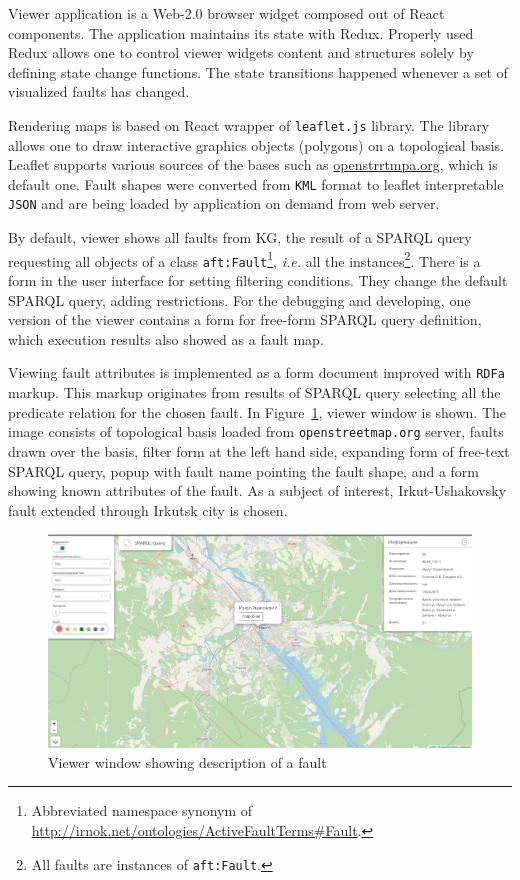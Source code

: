 \documentclass[
]{ceurart}
\begin{document}
Viewer application is a Web-2.0 browser widget composed out of React components.  The application maintains its state with Redux. Properly used Redux allows one to control viewer widgets content and structures solely by defining state change functions.  The state transitions happened whenever a set of visualized faults has changed.

Rendering maps is based on React wrapper of \texttt{leaflet.js} library.  The library allows one to draw interactive graphics objects (polygons) on a topological basis.  Leaflet supports various sources of the bases such as \href{https://openstreetmap.org/}{openstrrtmpa.org}, which is default one.  Fault shapes were converted from \texttt{KML} format to leaflet interpretable \texttt{JSON} and are being loaded by application on demand from web server.

By default, viewer shows all faults from KG, the result of a SPARQL query requesting all objects of a class \texttt{aft:Fault}\footnote{Abbreviated namespace synonym of \url{http://irnok.net/ontologies/ActiveFaultTerms\#Fault}.}, \emph{i.e.} all the instances\footnote{All faults are instances of \texttt{aft:Fault}.}.  There is a form in the user interface for setting filtering conditions.  They change the default SPARQL query, adding restrictions.  For the debugging and developing, one version of the viewer contains a form for free-form SPARQL query definition, which execution results also showed as a fault map.

Viewing fault attributes is implemented as a form document improved with \texttt{RDFa} markup.  This markup originates from results of SPARQL query selecting all the predicate relation for the chosen fault.
%
%
In Figure~\ref{fig:ex}, viewer window is shown.  The image consists of topological basis loaded from \texttt{openstreetmap.org} server, faults drawn over the basis, filter form at the left hand side, expanding form of free-text SPARQL query, popup with fault name pointing the fault shape, and a form showing known attributes of the fault.  As a subject of interest, Irkut-Ushakovsky fault extended through Irkutsk city is chosen.

\begin{figure}
  \centering
  \includegraphics[width=\linewidth]{faults-leaflet-doc.png}
  \caption{Viewer window showing description of a fault}
  \label{fig:ex}
\end{figure}
\end{document}
